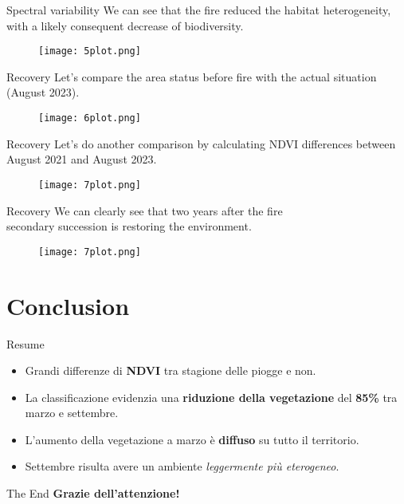 \documentclass{beamer}
\begin{document}
\begin{frame}{Spectral variability}
\centering
We can see that the fire reduced the habitat heterogeneity,\\ with a likely consequent decrease of biodiversity.  
\begin{figure}
    \centering
    \texttt{[image: 5plot.png]}
\end{figure}
\end{frame}

\begin{frame}{Recovery}
\centering
Let's compare the area status before fire with the actual situation (August 2023). 
\begin{figure}
       \centering
       \texttt{[image: 6plot.png]}
   \end{figure}   
\end{frame}

\begin{frame}{Recovery}
\centering
Let's do another comparison by calculating NDVI differences between August 2021 and August 2023.
\begin{figure}
     \centering
     \texttt{[image: 7plot.png]}
 \end{figure} 
\end{frame}

\begin{frame}{Recovery}
\centering
We can clearly see that two years after the fire\\ secondary succession is restoring the environment.
\begin{figure}
     \centering
     \texttt{[image: 7plot.png]}
 \end{figure} 
\end{frame}


\section{Conclusion} %

\begin{frame}{Resume}
\begin{itemize}
    \item Grandi differenze di \textbf{NDVI} tra stagione delle piogge e non.
    \bigskip
    \pause \item La classificazione evidenzia una \textbf{riduzione della vegetazione} del \textbf{85\%} tra marzo e settembre.
    \bigskip
    \pause \item L'aumento della vegetazione a marzo è \textbf{diffuso} su tutto il territorio.
    \bigskip
    \pause \item Settembre risulta avere un ambiente \textit{leggermente più eterogeneo}.
\end{itemize}
\end{frame}

\begin{frame}{The End}
\centering
\large \textbf{Grazie dell'attenzione!}
\end{frame}
\end{document}
